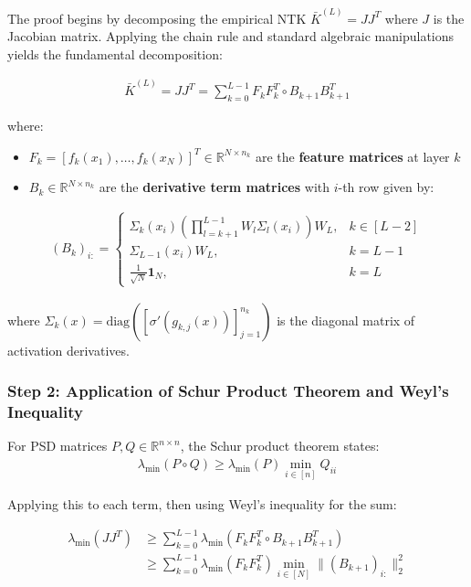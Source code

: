 \documentclass{article}
\newcommand{\R}{\mathbb{R}}
\newcommand{\evmin}[1]{\lambda_{\min}\left(#1\right)}
\begin{document}
The proof begins by decomposing the empirical NTK $\bar{K}^{(L)} = JJ^T$ where $J$ is the Jacobian matrix. Applying the chain rule and standard algebraic manipulations yields the fundamental decomposition:

\begin{align}
\bar{K}^{(L)} = JJ^T = \sum_{k=0}^{L-1} F_k F_k^T \circ B_{k+1} B_{k+1}^T
\end{align}

where:
\begin{itemize}
    \item $F_k = [f_k(x_1), \ldots, f_k(x_N)]^T \in \R^{N \times n_k}$ are the \textbf{feature matrices} at layer $k$
    \item $B_k \in \R^{N \times n_k}$ are the \textbf{derivative term matrices} with $i$-th row given by:
\end{itemize}

\begin{align}
(B_k)_{i:} = \begin{cases}
\Sigma_k(x_i) \left(\prod_{l=k+1}^{L-1} W_l \Sigma_l(x_i)\right) W_L, & k \in [L-2] \\
\Sigma_{L-1}(x_i) W_L, & k = L-1 \\
\frac{1}{\sqrt{N}} \mathbf{1}_N, & k = L
\end{cases}
\end{align}

where $\Sigma_k(x) = \text{diag}([\sigma'(g_{k,j}(x))]_{j=1}^{n_k})$ is the diagonal matrix of activation derivatives.

\subsubsection{Step 2: Application of Schur Product Theorem and Weyl's Inequality}

For PSD matrices $P, Q \in \R^{n \times n}$, the Schur product theorem states:
\begin{align}
\evmin{P \circ Q} \geq \evmin{P} \min_{i \in [n]} Q_{ii}
\end{align}

Applying this to each term, then using Weyl's inequality for the sum:

\begin{align}
\evmin{JJ^T} &\geq \sum_{k=0}^{L-1} \evmin{F_k F_k^T \circ B_{k+1} B_{k+1}^T} \\
&\geq \sum_{k=0}^{L-1} \evmin{F_k F_k^T} \min_{i \in [N]} \|(B_{k+1})_{i:}\|_2^2
\end{align}
\end{document}
